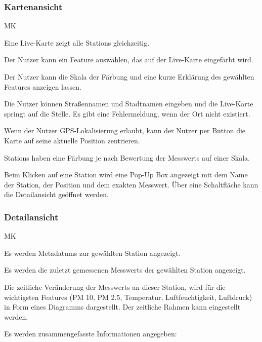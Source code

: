 \subsubsection*{\gls{Kartenansicht}}
\begin{Kriterien}{MK}

	\item Eine \gls{Live-Karte} zeigt alle \glspl{Station} gleichzeitig. 
	
	\item Der Nutzer kann ein \gls{Feature} auswählen, das auf der \gls{Live-Karte} eingefärbt wird.
	
	\item Der Nutzer kann die Skala der Färbung und eine kurze Erklärung des gewählten \gls{Feature}s anzeigen lassen.
	
	\item Die Nutzer können Straßennamen und Stadtnamen eingeben und die \gls{Live-Karte} springt auf die Stelle. 
		Es gibt eine Fehlermeldung, wenn der Ort nicht existiert.
	
	\item Wenn der Nutzer GPS-Lokalisierung erlaubt, kann der Nutzer per Button die Karte auf seine aktuelle Position zentrieren.

	\item \glspl{Station} haben eine Färbung je nach Bewertung der \glspl{Messwert} auf einer Skala.
	
	\item Beim Klicken auf eine \gls{Station} wird eine \gls{Pop-Up} Box angezeigt mit dem Name der Station, der Position und dem exakten \gls{Messwert}.
		Über eine Schaltfläche kann die \gls{Detailansicht} geöffnet werden. 
\end{Kriterien}

\subsubsection*{\gls{Detailansicht}}
\begin{Kriterien}{MK}
	\item Es werden \glspl{Metadatum} zur gewählten \gls{Station} angezeigt.
	
	\item Es werden die zuletzt gemessenen \glspl{Messwert} der gewählten \gls{Station} angezeigt.

	\item Die zeitliche Veränderung der \glspl{Messwert} an dieser \gls{Station}, wird für die wichtigsten \glspl{Feature} (PM 10, 
	PM 2.5, Temperatur, Luftfeuchtigkeit, Luftdruck) in Form eines Diagramms dargestellt. Der zeitliche Rahmen kann eingestellt 
	werden.

	\item Es werden zusammengefasste Informationen angegeben: 
\end{Kriterien}
		
